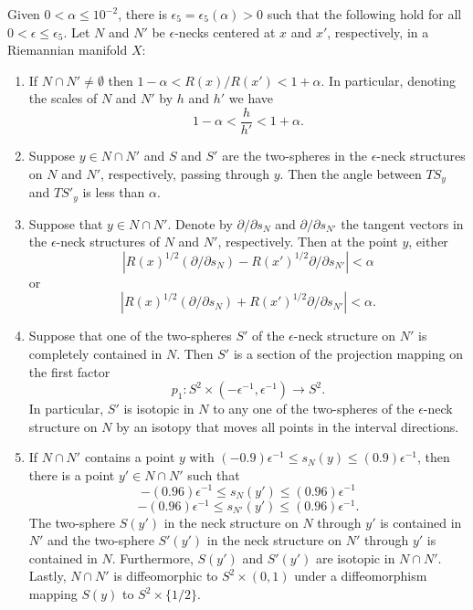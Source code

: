\begin{proposition}
\label{prop:overlapping-necks-properties}
\label{S2intersection}
Given $0<\alpha\le 10^{-2}$, there is
$\epsilon_5=\epsilon_5(\alpha)>0$ such that the following hold for
all $0<\epsilon\le \epsilon_5$. Let $N$ and $N'$ be $\epsilon$-necks
centered at $x$ and $x'$, respectively, in a Riemannian manifold
$X$:
\begin{enumerate}
\item[(1)] If $N\cap N'\not=\emptyset$ then
$1-\alpha<R(x)/R(x')<1+\alpha$. In particular, denoting the scales
of $N$ and $N'$ by $h$ and $h'$ we have
$$1-\alpha<\frac{h}{h'}<1+\alpha.$$
\item[(2)] Suppose $y\in N\cap N'$ and $S$ and $S'$ are the two-spheres in the $\epsilon$-neck
structures on $N$ and $N'$, respectively, passing through $y$. Then
the angle between $TS_y$ and $TS'_y$ is less than $\alpha$.
\item[(3)] Suppose that $y\in N\cap N'$. Denote by $\partial/\partial s_N$ and $\partial/\partial s_{N'}$
the tangent vectors in the $\epsilon$-neck structures of $N$ and
$N'$, respectively. Then at the point $y$, either
$$|R(x)^{1/2}(\partial /\partial s_N)-R(x')^{1/2}\partial/\partial s_{N'}|<\alpha$$
or
$$|R(x)^{1/2}(\partial /\partial s_N)+R(x')^{1/2}\partial/\partial s_{N'}|<\alpha.$$
 \item[(4)] Suppose that
one of the two-spheres $S'$ of the $\epsilon$-neck structure on $N'$
is completely contained in $N$. Then $S'$ is a section of the
projection mapping on the first factor
$$p_1\colon S^2\times(-\epsilon^{-1},\epsilon^{-1})\to S^2.$$
In particular, $S'$ is isotopic in $N$ to any one of the two-spheres
of the $\epsilon$-neck structure on $N$ by an isotopy that moves all
points in the interval directions.
\item[(5)] If $N\cap N'$ contains a point $y$ with $(-0.9)\epsilon^{-1}\le s_N(y)\le
(0.9)\epsilon^{-1}$, then there is a point $y'\in N\cap N'$ such
that
$$-(0.96)\epsilon^{-1}\le s_N(y')\le (0.96)\epsilon^{-1}$$
$$-(0.96)\epsilon^{-1}\le s_{N'}(y')\le (0.96)\epsilon^{-1}.$$
The two-sphere $S(y')$ in the neck structure on $N$ through $y'$ is contained
in $N'$ and the two-sphere $S'(y')$ in the neck structure on $N'$ through $y'$
is contained in $N$. Furthermore, $S(y')$ and $S'(y')$ are isotopic in $N\cap
N'$. Lastly, $N\cap N'$ is diffeomorphic to $S^2\times (0,1)$ under a
diffeomorphism mapping $S(y)$ to $S^2\times \{1/2\}$.
\end{enumerate}
\end{proposition}


